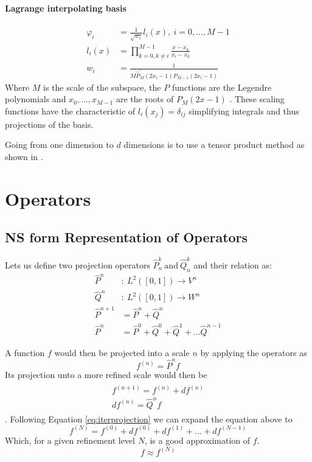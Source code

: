 \documentclass[../master_thesis.tex]{subfiles}
\begin{document}
\paragraph{Lagrange interpolating basis}
  \begin{align}
    \varphi_i &= \frac{1}{\sqrt{w_i}}l_i(x), \ i = 0, ..., M-1\\
    l_i(x) &= \prod^{M-1}_{k = 0, k\neq i} \frac{x-x_k}{x_i-x_k} \\
    w_i &= \frac{1}{M\hat{P}^\prime_M(2x_i-1)P_{M-1}(2x_i-1)}
  \end{align}
Where $M$ is the scale of the subspace, the $P$ functions are the Legendre polynomials and
$x_0, ..., x_{M-1}$ are the roots of $P_M(2x-1)$ \cite{Beylkin:MRA}.
These scaling functions have the characteristic of $l_i(x_j)=\delta_{ij}$ simplifying
integrals and thus projections of the basis.

Going from one dimension to $d$ dimensions is to use a tensor product method as shown in
\cite{Frediani:2013}.
\section{Operators}
\subsection{\ac{NS} form Representation of Operators}
Lets us define two projection operators $\hat{P}^k_n \ \text{and}\ \hat{Q}^k_n $  and their relation as:
\begin{align}
  \hat{P}^n &: \ L^2([0, 1]) \to V^n \\
  \hat{Q}^n &:\  L^2([0, 1]) \to W^n \\
  \hat{P}^{n+1} &= \hat{P}^n + \hat{Q}^n\\
  \hat{P}^n &= \hat{P}^0 + \hat{Q}^0 + \hat{Q}^1 + ...  \hat{Q}^{n-1}\label{eq:iterprojection}
\end{align}

A function $f$ would then be projected into a scale $n$ by applying the
operators as \cite{Frediani:2013}
\begin{equation}
   f^{(n)} = \hat{P}^n f
\end{equation}
Its projection unto a more refined scale would then be \cite{Frediani:2013}
\begin{align}\label{eq:refinef}
  \begin{split}
    f^ {(n+1)} = f^{(n)} + df^{(n)}\\
    df^{(n)} = \hat{Q}^nf
  \end{split}
\end{align}.
Following Equation \ref{eq:iterprojection} we can expand the equation above to
\begin{equation}
  f^{(N)} = f^{(0)} + df^{(0)} + df^{(1)} + ... + df^{(N-1)}
\end{equation}
Which, for a given refinement level $N$, is a good approximation of $f$.
\begin{equation}
  f \approx f^{(N)}
\end{equation}
\end{document}
